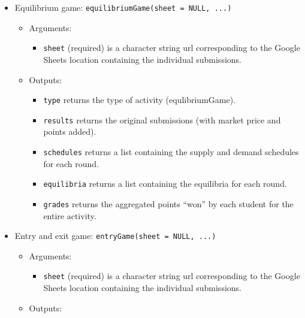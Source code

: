 \documentclass[
]{article}
\providecommand{\tightlist}{%
  \setlength{\itemsep}{0pt}\setlength{\parskip}{0pt}}
\begin{document}
\begin{itemize}
\item
  Equilibrium game: \texttt{equilibriumGame(sheet\ =\ NULL,\ ...)}

  \begin{itemize}
  \item
    Arguments:

    \begin{itemize}
    \tightlist
    \item
      \texttt{sheet} (required) is a character string url corresponding
      to the Google Sheets location containing the individual
      submissions.
    \end{itemize}
  \item
    Outputs:

    \begin{itemize}
    \tightlist
    \item
      \texttt{type} returns the type of activity (equlibriumGame).
    \item
      \texttt{results} returns the original submissions (with market
      price and points added).
    \item
      \texttt{schedules} returns a list containing the supply and demand
      schedules for each round.
    \item
      \texttt{equilibria} returns a list containing the equilibria for
      each round.
    \item
      \texttt{grades} returns the aggregated points ``won'' by each
      student for the entire activity.
    \end{itemize}
  \end{itemize}
\item
  Entry and exit game: \texttt{entryGame(sheet\ =\ NULL,\ ...)}

  \begin{itemize}
  \item
    Arguments:

    \begin{itemize}
    \tightlist
    \item
      \texttt{sheet} (required) is a character string url corresponding
      to the Google Sheets location containing the individual
      submissions.
    \end{itemize}
  \item
    Outputs:


\end{itemize}
\end{itemize}
\end{document}
